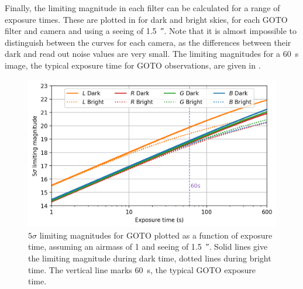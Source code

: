 \begin{colsection}
Finally, the limiting magnitude in each filter can be calculated for a range of exposure times. These are plotted in  for dark and bright skies, for each GOTO filter and camera and using a seeing of \SI{1.5}{\arcsecond}. Note that it is almost impossible to distinguish between the curves for each camera, as the differences between their dark and read out noise values are very small. The limiting magnitudes for a \SI{60}{\second} image, the typical exposure time for GOTO observations, are given in .

\begin{figure}[t]
    \begin{center}
        \includegraphics[width=\linewidth]{images/throughput/limiting_mag.png}
    \end{center}
    \caption[$5\sigma$ limiting magnitudes for GOTO]{
        $5\sigma$ limiting magnitudes for GOTO plotted as a function of exposure time, assuming an airmass of 1 and seeing of \SI{1.5}{\arcsecond}. Solid lines give the limiting magnitude during dark time, dotted lines during bright time. The  vertical line marks \SI{60}{\second}, the typical GOTO exposure time.
    }\label{fig:lim_mags}
\end{figure}


\end{colsection}
